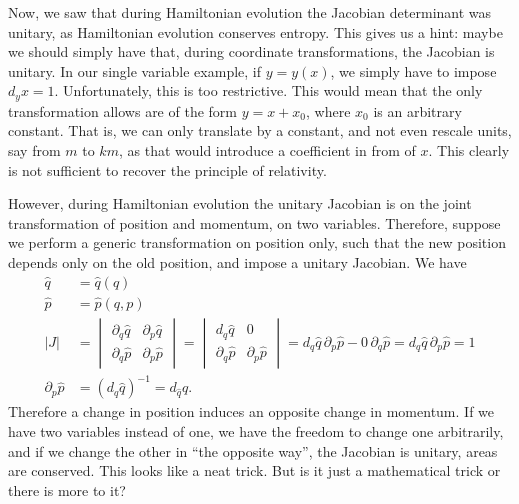 Now, we saw that during Hamiltonian evolution the Jacobian determinant was unitary, as Hamiltonian evolution conserves entropy. This gives us a hint: maybe we should simply have that, during coordinate transformations, the Jacobian is unitary. In our single variable example, if $y = y(x)$, we simply have to impose $d_y x = 1$. Unfortunately, this is too restrictive. This would mean that the only transformation allows are of the form $y=x+x_0$, where $x_0$ is an arbitrary constant. That is, we can only translate by a constant, and not even rescale units, say from $m$ to $km$, as that would introduce a coefficient in from of $x$. This clearly is not sufficient to recover the principle of relativity.

However, during Hamiltonian evolution the unitary Jacobian is on the joint transformation of position and momentum, on two variables. Therefore, suppose we perform a generic transformation on position only, such that the new position depends only on the old position, and impose a unitary Jacobian. We have
\begin{equation}
	\begin{aligned}
		\hat{q} &= \hat{q}(q) \\
		\hat{p} &= \hat{p}(q, p) \\
		|J| &= \begin{vmatrix}
			\partial_{q} \hat{q} & \partial_{p} \hat{q}  \\
			\partial_{q} \hat{p} & \partial_{p} \hat{p}
		\end{vmatrix}
		= \begin{vmatrix}
			d_{q} \hat{q} & 0 \\
			\partial_{q} \hat{p} & \partial_{p} \hat{p}
		\end{vmatrix} 
		= d_{q} \hat{q} \, \partial_{p} \hat{p} - 0 \, \partial_{q} \hat{p} = d_{q} \hat{q} \, \partial_{p} \hat{p} = 1 \\
		\partial_{p} \hat{p} &= (d_{q} \hat{q})^{-1} = d_{\hat{q}} q.
	\end{aligned}
\end{equation}
Therefore a change in position induces an opposite change in momentum. If we have two variables instead of one, we have the freedom to change one arbitrarily, and if we change the other in ``the opposite way'', the Jacobian is unitary, areas are conserved. This looks like a neat trick. But is it just a mathematical trick or there is more to it?

